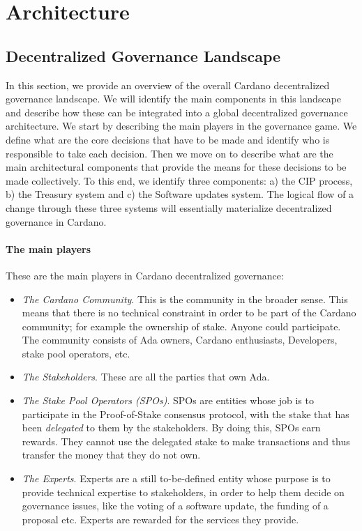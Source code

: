 \section{Architecture} \label{architecture}

\subsection{Decentralized Governance Landscape}
\label{decentralized_governance_landscape}

In this section, we provide an overview of the overall Cardano
decentralized governance landscape. We will identify the main components in
this landscape and describe how these can be integrated into a global
decentralized governance architecture.  We start by describing the main players
in the governance game. We define what are the core decisions that have to be
made and identify who is responsible to take each decision.  Then we move on to
describe what are the main architectural components that provide the means for
these decisions to be made collectively. To this end, we identify three
components: a) the CIP process, b) the Treasury system and c) the Software
updates system. The logical flow of a change through these three systems will
essentially materialize decentralized governance in Cardano.

\paragraph{The main players}
These are the main players in Cardano decentralized governance:
\begin{itemize}
	\item \emph{The Cardano Community}. This is the community in the broader
	sense. This means that there is no technical constraint in order to be part
	of the Cardano community; for example the ownership of stake. Anyone could
	participate. The community consists of Ada owners, Cardano enthusiasts,
	Developers, stake pool operators, etc.
	\item \emph{The Stakeholders}. These are all the parties that own Ada.
	\item \emph{The Stake Pool Operators (SPOs)}. SPOs are entities whose job
	is to participate in the Proof-of-Stake consensus protocol, with the stake
	that has been
	\emph{delegated} to them by the
	stakeholders. By doing this, SPOs earn rewards. They
	cannot use the delegated stake to make transactions and thus
	transfer the
	money that they do not own.
	\item \emph{The Experts}. Experts are a still to-be-defined entity whose
	purpose is to provide technical expertise to stakeholders, in order to help
	them decide on governance issues, like the voting of a software update, the
	funding of a proposal etc. Experts are rewarded for the services they
	provide.
\end{itemize}

